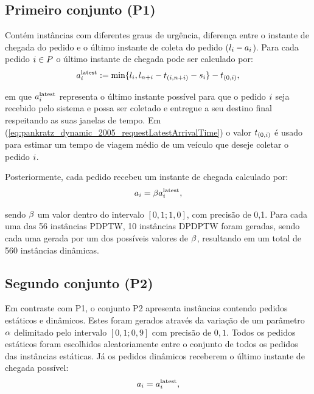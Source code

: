 \subsection{Primeiro conjunto (P1)}
Contém instâncias com diferentes graus de urgência, diferença entre o instante 
de chegada do pedido  e o último instante de coleta do
pedido ($l_i - a_i$). 
Para cada pedido $i \in P$ o último instante de chegada 
pode ser calculado por: 
%
\begin{equation}
  a{}_{i{}}^{\mathrm{latest}} := 
  \min\{l_i, l_{n + i} 
  - t_{(i,n + i)} 
  - s_i\} - t_{(0,i)},
  \label{eq:pankratz_dynamic_2005_requestLatestArrivalTime}
\end{equation}

\noindent em que $a{}_{i{}}^{\mathrm{latest}}$ representa o último instante 
possível para que o pedido $i$ seja recebido pelo sistema e possa ser 
coletado e entregue a seu destino final respeitando as suas janelas de tempo.
Em (\ref{eq:pankratz_dynamic_2005_requestLatestArrivalTime}) o valor
$t_{(0,i)}$ é usado para estimar um tempo de 
viagem médio de um veículo que deseje coletar o pedido $i$.

Posteriormente, cada pedido recebeu um instante de chegada calculado por: 
%
\begin{equation}
  a_i = \beta a{}_{i{}}^{\mathrm{latest}}, 
\end{equation}

\noindent sendo $\beta$ um valor dentro do intervalo $[0{,}1; 1{,}0]$, 
com precisão de 0,1. 
Para cada uma das 56 instâncias PDPTW, 10 instâncias DPDPTW foram geradas, 
sendo cada uma gerada por um dos possíveis valores de $\beta$,
resultando em um total de 560 instâncias dinâmicas.

\subsection{Segundo conjunto (P2)}
Em contraste com P1, o conjunto P2 apresenta instâncias contendo pedidos 
estáticos e dinâmicos. 
Estes foram gerados através da variação de um parâmetro $\alpha$ 
delimitado pelo intervalo $[0,1; 0,9]$ com precisão de $0,1$.
Todos os pedidos estáticos foram escolhidos aleatoriamente entre o conjunto de 
todos os pedidos das instâncias estáticas. Já os pedidos dinâmicos receberem o 
último instante de chegada possível:
%
\begin{equation}
  a_i = a{}_{i{}}^{\mathrm{latest}},
\end{equation}

